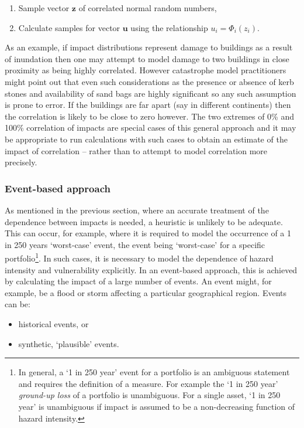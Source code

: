 \documentclass[a4paper,11pt]{extarticle} %
\begin{document}
\begin{enumerate}[]
	\item Sample vector $\mathbf{z}$ of correlated normal random numbers,
	\item Calculate samples for vector $\mathbf{u}$ using the relationship $u_i = \Phi_i(z_i)$.
\end{enumerate}

As an example, if impact distributions represent damage to buildings as a result of inundation then one may attempt to model damage to two buildings in close proximity as being highly correlated. However catastrophe model practitioners might point out that even such considerations as the presence or absence of kerb stones and availability of sand bags are highly significant so any such assumption is prone to error. If the buildings are far apart (say in different continents) then the correlation is likely to be close to zero however. The two extremes of 0\% and 100\% correlation of impacts are special cases of this general approach and it may be appropriate to run calculations with such cases to obtain an estimate of the impact of correlation -- rather than to attempt to model correlation more precisely. 


\subsubsection{Event-based approach}
As mentioned in the previous section, where an accurate treatment of the dependence between impacts is needed, a heuristic is unlikely to be adequate. This can occur, for example, where it is required to model the occurrence of a 1 in 250 years `worst-case' event, the event being `worst-case' for a specific portfolio\footnote{In general, a `1 in 250 year' event for a portfolio is an ambiguous statement and requires the definition of a measure. For example the `1 in 250 year' \emph{ground-up loss} of a portfolio is unambiguous. For a single asset, `1 in 250 year' is unambiguous if impact is assumed to be a non-decreasing function of hazard intensity.}. In such cases, it is necessary to model the dependence of hazard intensity and vulnerability explicitly. In an event-based approach, this is achieved by calculating the impact of a large number of events. An event might, for example, be a flood or storm affecting a particular geographical region. Events can be:

\begin{itemize}
	\item historical events, or
	\item synthetic, `plausible' events.
\end{itemize}
\end{document}
